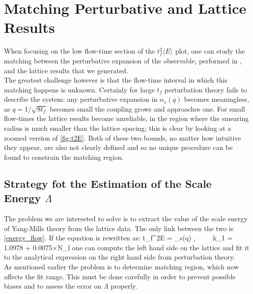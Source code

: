 \section{Matching Perturbative and Lattice Results}
When focusing on the low flow-time section of the $t_f^2\langle E \rangle$ plot, one can study the matching between the perturbative expansion of the observable, performed in \cite{luscher_properties_2010}, and the lattice results that we generated. \\
The greatest challenge however is that the flow-time interval in which this matching happens is unknown. Certainly for large $t_f$ perturbation theory fails to describe the system: any perturbative expansion in $\alpha_s(q)$ becomes meaningless, as $q=1/\sqrt{8t_f}$ becomes small the coupling grows and approaches one. For small flow-times the lattice results become unreliable, in the region where the smearing radius is much smaller than the lattice spacing; this is clear by looking at a zoomed version of \cref{fig:t2E}. Both of these two bounds, no matter how intuitive they appear, are also not clearly defined and so no unique procedure can be found to constrain the matching region.

\subsection{Strategy fot the Estimation of the Scale Energy $\Lambda$}
The problem we are interested to solve is to extract the value of the scale energy of Yang-Mills theory from the lattice data. The only link between the two is \cref{energy_flow}. If the equation is rewritten as:
\beq
t_f^2\langle E \rangle =  \alpha_s(q) ,~~~~~k_1 = 1.0978 + 0.0075×N_f
    \label{energy_flow}
\eeq  
one can compute the left hand side on the lattice and fit it to the analytical expression on the right hand side from perturbation theory. \\
As mentioned earlier the problem is to determine matching region, which now affects the fit range. This must be done carefully in order to prevent possible biases and to assess the error on $\Lambda$ properly.